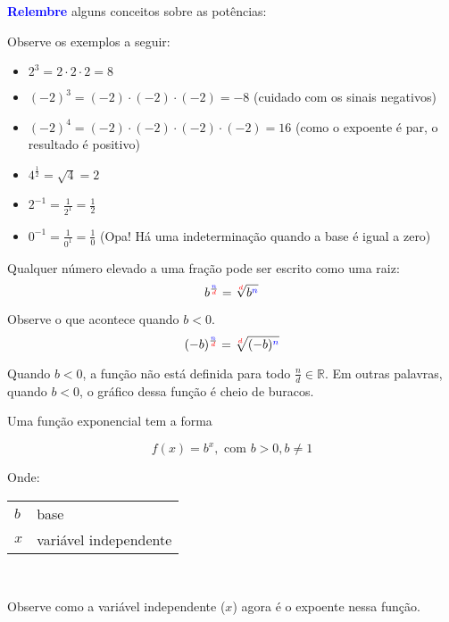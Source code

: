 \documentclass[12pt,openright,twoside,a4paper]{article}
\makeatletter
\theoremstyle{definition}
\newenvironment{condicoes}[1][Onde:]
{#1 \begin{tabular}[t]{>{$}l<{$} @{${} \implies {}$} l}}
	{\end{tabular}\\[\belowdisplayskip]}
\makeatother
\begin{document}
	\begin{snugshade}
		\textbf{\textcolor{blue}{Relembre}} alguns conceitos sobre as potências:
		
		Observe os exemplos a seguir:
		
		\begin{itemize}
			\item $2^3 = 2 \cdot 2 \cdot 2 = 8$
			\item $(-2)^3 = (-2) \cdot (-2) \cdot (-2) = -8$ (cuidado com os sinais negativos)
			\item $(-2)^4 = (-2) \cdot (-2) \cdot (-2) \cdot (-2) = 16$ (como o expoente é par, o resultado é positivo)
			\item $4^\frac{1}{2} = \sqrt{4} = 2$ 
			\item $\displaystyle 2^{-1} = \frac{1}{2^1} = \frac{1}{2}$
			\item $\displaystyle 0^{-1} = \frac{1}{0^1} = \frac{1}{0}$ (Opa! Há uma indeterminação quando a base é igual a zero)
		\end{itemize}
		
		
		Qualquer número elevado a uma fração pode ser escrito como uma raiz:
		\begin{equation*}
			b^{\frac{{\textcolor{blue}{n}}}{{\textcolor{red}{d}}}} = \sqrt[{\textcolor{red}{d}}]{b^{\textcolor{blue}{n}}}
		\end{equation*}
		
		Observe o que acontece quando $b<0$.
		\begin{equation*}
			(-b)^{\frac{{\textcolor{blue}{n}}}{{\textcolor{red}{d}}}} = \sqrt[{\textcolor{red}{d}}]{(-b)^{\textcolor{blue}{n}}}
		\end{equation*}
		
		Quando $b<0$, a função não está definida para todo $\frac{n}{d} \in \mathbb{R}$. Em outras palavras, quando $b<0$, o gráfico dessa função é cheio de buracos.
	\end{snugshade}
	
	Uma função exponencial tem a forma
	
	\begin{equation}
		f(x) = b^x, \text{ com } b > 0, b \neq 1 
	\end{equation}
	
	\begin{condicoes}
		b & base\\
		x & variável independente
	\end{condicoes}
	
	Observe como a variável independente ($x$) agora é o expoente nessa função.
	
\end{document}
